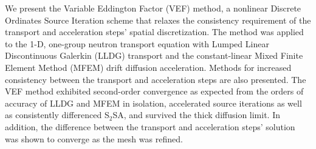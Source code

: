 We present the Variable Eddington Factor (VEF) method, a nonlinear Discrete Ordinates Source Iteration scheme that relaxes the consistency requirement of the transport and acceleration steps' spatial discretization. The method was applied to the 1-D, one-group neutron transport equation with Lumped Linear Discontinuous Galerkin (LLDG) transport and the constant-linear Mixed Finite Element Method (MFEM) drift diffusion acceleration. Methods for increased consistency between the transport and acceleration steps are also presented. The VEF method exhibited second-order convergence as expected from the orders of accuracy of LLDG and MFEM in isolation, accelerated source iterations as well as consistently differenced S$_2$SA, and survived the thick diffusion limit. In addition, the difference between the transport and acceleration steps' solution was shown to converge as the mesh was refined. 